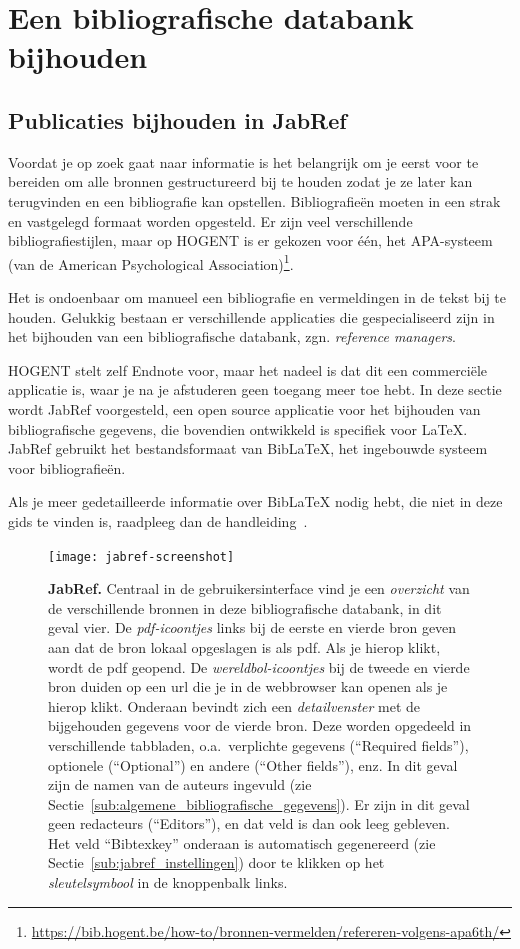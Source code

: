 \chapter{Een bibliografische databank bijhouden}
\label{ch:bibliografie}

\section{Publicaties bijhouden in JabRef}
\label{sec:publicaties_bijhouden_in_jabref}

Voordat je op zoek gaat naar informatie is het belangrijk om je eerst voor te bereiden om alle bronnen gestructureerd bij te houden zodat je ze later kan terugvinden en een bibliografie kan opstellen. Bibliografieën moeten in een strak en vastgelegd formaat worden opgesteld. Er zijn veel verschillende bibliografiestijlen, maar op HOGENT is er gekozen voor één, het APA-systeem (van de American Psychological Association)\footnote{\url{https://bib.hogent.be/how-to/bronnen-vermelden/refereren-volgens-apa6th/}}.

Het is ondoenbaar om manueel een bibliografie en vermeldingen in de tekst bij te houden.  Gelukkig bestaan er verschillende applicaties die gespecialiseerd zijn in het bijhouden van een bibliografische databank, zgn. \emph{reference managers}.

HOGENT stelt zelf Endnote voor, maar het nadeel is dat dit een commerciële applicatie is, waar je na je afstuderen geen toegang meer toe hebt. In deze sectie wordt JabRef voorgesteld, een open source applicatie voor het bijhouden van bibliografische gegevens, die bovendien ontwikkeld is specifiek voor {\LaTeX}. JabRef gebruikt het bestandsformaat van Bib{\LaTeX}, het ingebouwde systeem voor bibliografieën.

Als je meer gedetailleerde informatie over Bib{\LaTeX} nodig hebt, die niet in deze gids te vinden is, raadpleeg dan de handleiding~\autocite{LehmanEtAl2016}.

\begin{figure}
  \centering
  \texttt{[image: jabref-screenshot]}
  \caption[JabRef]{\textbf{JabRef.} Centraal in de gebruikersinterface vind je een \emph{overzicht} van de verschillende bronnen in deze bibliografische databank, in dit geval vier. De \emph{pdf-icoontjes} links bij de eerste en vierde bron geven aan dat de bron lokaal opgeslagen is als pdf. Als je hierop klikt, wordt de pdf geopend. De \emph{wereldbol-icoontjes} bij de tweede en vierde bron duiden op een url die je in de webbrowser kan openen als je hierop klikt. Onderaan bevindt zich een \emph{detailvenster} met de bijgehouden gegevens voor de vierde bron. Deze worden opgedeeld in verschillende tabbladen, o.a.~verplichte gegevens (``Required fields''), optionele (``Optional'') en andere (``Other fields''), enz. In dit geval zijn de namen van de auteurs ingevuld (zie Sectie~\ref{sub:algemene_bibliografische_gegevens}). Er zijn in dit geval geen redacteurs (``Editors''), en dat veld is dan ook leeg gebleven. Het veld ``Bibtexkey'' onderaan is automatisch gegenereerd (zie Sectie~\ref{sub:jabref_instellingen}) door te klikken op het \emph{sleutelsymbool} in de knoppenbalk links.}
  \label{fig:jabref}
\end{figure}


